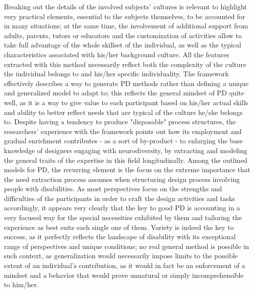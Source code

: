 Breaking out the details of the involved subjects' cultures is relevant to highlight very
practical elements, essential to the subjects themselves, to be accounted for in many
situations; at the same time, the involvement of additional support from adults, parents,
tutors or educators and the customization of activities allow to take full advantage of the
whole skillset of the individual, as well as the typical characteristics associated with his/her
background culture. All the features extracted with this method necessarily reflect both the complexity of the
culture the individual belongs to and his/her specific individuality.
The framework effectively describes a way to generate PD methods rather than defining
a unique and generalized model to adapt to; this reflects the general mindset of PD quite
well, as it is a way to give value to each participant based on his/her actual skills and ability
to better reflect needs that are typical of the culture he/she belongs to. Despite having a tendency to produce "disposable" process structures, the researchers'
experience with the framework points out how its employment and gradual enrichment
contributes - as a sort of by-product - to enlarging the base knowledge of designers
engaging with neurodiversity, by extracting and modeling the general traits of the
expertise in this field longitudinally.
Among the outlined models for PD, the recurring element is the focus on the extreme
importance that the need extraction process assumes when structuring design process
involving people with disabilities.
As most perspectives focus on the strengths and difficulties of the participants in order to
craft the design activities and tasks accordingly, it appears very clearly that the key to good
PD is accounting in a very focused way for the special necessities exhibited by them and
tailoring the experience as best suits each single one of them.
Variety is indeed the key to success, as it perfectly reflects the landscape of disability with
its exceptional range of perspectives and unique conditions; no real general method is
possible in such context, as generalization would necessarily impose limits to the possible
extent of an individual's contribution, as it would in fact be an enforcement of a mindset
and a behavior that would prove unnatural or simply incomprehensible to him/her.

 